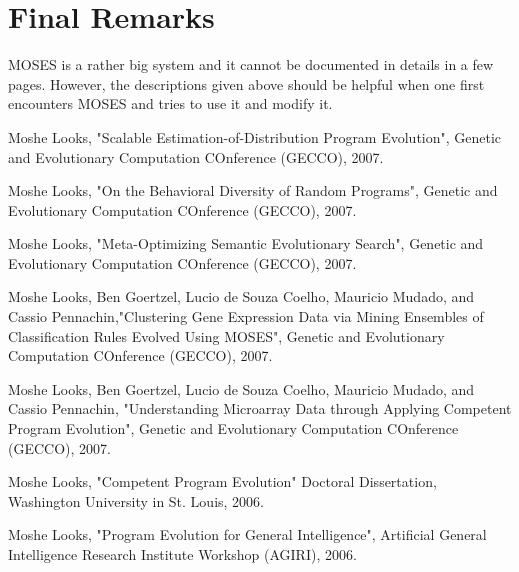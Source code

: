 \documentclass{article}
\begin{document}
\section{Final Remarks}

MOSES is a rather big system and it cannot be documented in details
in a few pages. However, the descriptions given above should be 
helpful when one first encounters MOSES and tries to use it and 
modify it. 



\begin{thebibliography}{10}

Moshe Looks, "Scalable Estimation-of-Distribution Program Evolution",
Genetic and Evolutionary Computation COnference (GECCO), 2007.

Moshe Looks, "On the Behavioral Diversity of Random Programs", Genetic and
Evolutionary Computation COnference (GECCO), 2007.

Moshe Looks, "Meta-Optimizing Semantic Evolutionary Search", Genetic and
Evolutionary Computation COnference (GECCO), 2007.

Moshe Looks, Ben Goertzel, Lucio de Souza Coelho, Mauricio Mudado, and
Cassio Pennachin,"Clustering Gene Expression Data via Mining Ensembles of
Classification Rules Evolved Using MOSES", Genetic and Evolutionary
Computation COnference (GECCO), 2007.

Moshe Looks, Ben Goertzel, Lucio de Souza Coelho, Mauricio Mudado, and
Cassio Pennachin, "Understanding Microarray Data through Applying Competent
Program Evolution", Genetic and Evolutionary Computation COnference (GECCO),
2007.

Moshe Looks, "Competent Program Evolution" Doctoral Dissertation, Washington
University in St. Louis, 2006.

Moshe Looks, "Program Evolution for General Intelligence", Artificial
General Intelligence Research Institute Workshop (AGIRI), 2006.
\end{thebibliography}
\end{document}
